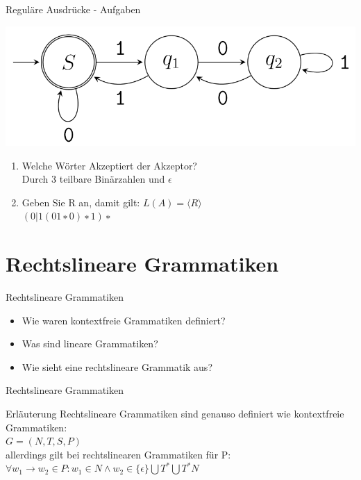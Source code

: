 	
	\begin{frame}{Reguläre Ausdrücke - Aufgaben}
		\begin{center}
			\includegraphics[scale=.3]{graphics/11/akzeptor1.png}
		\end{center}
		\begin{enumerate}
			\item Welche Wörter Akzeptiert der Akzeptor?\\
				\visible<2-> {\color{darkgreen}Durch 3 teilbare Binärzahlen und $\epsilon$\color{black}}
			\item Geben Sie R an, damit gilt: $L(A)= \langle R \rangle$\\
				\visible<3-> {\color{darkgreen}$(0|1(01∗0)∗1)∗$\color{black}}
		\end{enumerate}
	\end{frame}
	
	
	\section{Rechtslineare Grammatiken} 
	\begin{frame}{Rechtslineare Grammatiken}
		\begin{itemize}
			\item Wie waren kontextfreie Grammatiken definiert?
			\item Was sind lineare Grammatiken?
			\item Wie sieht eine rechtslineare Grammatik aus?
		\end{itemize}
	\end{frame}
	
	
	\begin{frame}{Rechtslineare Grammatiken} 
		\begin{block}{Erläuterung}
			Rechtslineare Grammatiken sind genauso definiert wie kontextfreie Grammatiken:\\
			$G=(N,T,S,P)$\\
			allerdings gilt bei rechtslinearen Grammatiken für P:\\
			$\forall w_1 \rightarrow w_2 \in P : w_1 \in N \land w_2 \in \{\epsilon\} \bigcup T^* \bigcup T^*N$
		\end{block}
	\end{frame}
	

